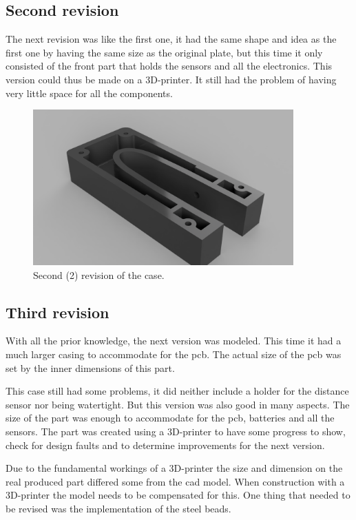 \subsection{Second revision}
The next revision was like the first one, it had the same shape and idea as the first one by having the same size as the original plate, but this time it only consisted of the front part that holds the sensors and all the electronics. This version could thus be made on a 3D-printer. It still had the problem of having very little space for all the components.

\begin{figure}[H]
\begin{center}
	\includegraphics[width = 10cm]{Figures/Case_rev_2.png}
	\caption{Second (2) revision of the case.}
	\label{Case_rev_2}
\end{center}
\end{figure}

\subsection{Third revision}
With all the prior knowledge, the next version was modeled. This time it had a much larger casing to accommodate for the \gls{pcb}. The actual size of the \gls{pcb} was set by the inner dimensions of this part.

This case still had some problems, it did neither include a holder for the distance sensor nor being watertight. But this version was also good in many aspects. The size of the part was enough to accommodate for the \gls{pcb}, batteries and all the sensors. The part was created using a 3D-printer to have some progress to show, check for design faults and to determine improvements for the next version.

Due to the fundamental workings of a 3D-printer the size and dimension on the real produced part differed some from the \gls{cad} model. When construction with a 3D-printer the model needs to be compensated for this. One thing that needed to be revised was the implementation of the steel beads.

